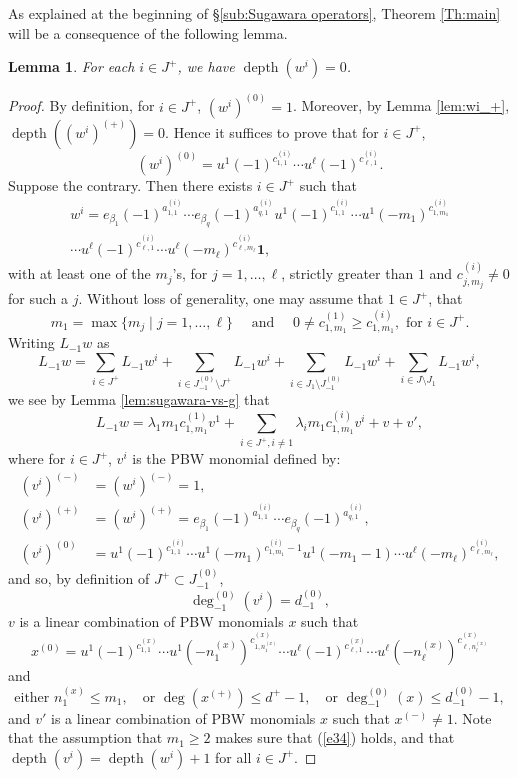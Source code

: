 \documentclass[11pt]{article}
\numberwithin{equation}{section}
\let\be\beta
\DeclareMathOperator{\dep}{depth}
\newtheorem{lem}[theorem]{Lemma}
\theoremstyle{definition}
\begin{document}
As explained at the beginning of \S\ref{sub:Sugawara operators}, Theorem
\ref{Th:main} will be a consequence of the following lemma.

\begin{lem}
\label{lem:w_0}
For each $i\in J^+$, we have $\dep(w^{i})=0$.
\end{lem}
\begin{proof}
By definition, for $i\in J^+$, $(w^i)^{(0)}=1$. Moreover, by Lemma \ref{lem:wi_+},
$\dep((w^i)^{(+)})=0$. Hence it suffices to prove that for $i\in J^+$,
\[
(w^{i})^{(0)}=u^{1}(-1)^{c^{(i)}_{1,1}}\cdots u^\ell (-1)^{c^{(i)}_{\ell,1}}.
\]
Suppose the contrary. Then
there exists $i \in J^+$ such that
\begin{multline*}
w^i = e_{\be_1}(-1)^{a^{(i)}_{1,1}}\cdots e_{\be_{q}}(-1)^{a^{(i)}_{q,1}} u^{1}(-1)^{c^{(i)}_{1,1}}
\cdots u^{1}(-m_{1})^{c^{(i)}_{1,m_1}} \\[-5pt]
\cdots u^\ell (-1)^{c^{(i)}_{\ell,1}} \cdots u^\ell(-m_{\ell})^{c^{(i)}_{\ell,m_\ell}} \mathbf{1},
\end{multline*}
with at least one of the $m_j$'s, for $j=1,\dots,\ell$, strictly greater than $1$
and $c^{(i)}_{j,m_j} \not=0$ for such a $j$.
Without loss of generality,
one may assume that $1 \in J^+$, that
\[
m_1=\max\{ m_j\mid j=1,\dots,\ell\} \quad \text{ and }
\quad 0\neq c^{(1)}_{1,m_1} \geq c^{(i)}_{1,m_1}, \text{ for } i\in J^+.
\]
Writing $L_{-1}w$ as
\[
L_{-1}w=\sum_{i \in J^+ }L_{-1}w^i
+\sum_{i\in J_{-1}^{(0)}\setminus J^+}L_{-1}w^i
+\sum_{i\in J_1\setminus J_{-1}^{(0)}}L_{-1}w^i
+\sum_{i \in J \setminus J_1}L_{-1}w^i,
\]
we see by Lemma \ref{lem:sugawara-vs-g} that
\begin{equation}\label{e17}
L_{-1}w=\lambda_1 m_1c^{(1)}_{1,m_1} v^1+\sum_{i\in J^+,i\neq 1}\lambda_im_1c^{(i)}_{1,m_1}v^i+v
+v',
\end{equation}
where for $i\in J^+$, $v^{i}$ is the PBW monomial defined by:
\begin{align}\label{e14}
(v^i)^{(-)}&=(w^i)^{(-)}=1,
\\
\label{e13}
(v^i)^{(+)}&=(w^i)^{(+)}=e_{\be_1}(-1)^{a^{(i)}_{1,1}}\cdots e_{\be_{q}}(-1)^{a^{(i)}_{q,1}},
\\
\label{e33}
(v^i)^{(0)} & = u^{1}(-1)^{c^{(i)}_{1,1}}\cdots
u^{1}(-m_{1})^{c^{(i)}_{1,m_1}-1}u^{1}(-m_{1}-1)\cdots u^\ell (-m_{\ell})^{c^{(i)}_{\ell,m_\ell}},
\end{align}
and so, by definition of $J^+ \subset J_{-1}^{(0)}$,
\begin{equation}\label{e34}
\deg_{-1}^{(0)}(v^i)=d_{-1}^{(0)},
\end{equation}
$v$ is a linear combination of PBW monomials $x$ such that
\[
x^{(0)}=u^{1}(-1)^{c^{(x)}_{1,1}}\cdots u^{1}(- n_{1}^{(x)})^{c^{(x)}_{1,n_{1}^{(x)}}}
\cdots u^\ell (-1)^{c^{(x)}_{\ell,1}}\cdots u^\ell(-n_{\ell}^{(x)})^{c^{(x)}_{\ell,n_{\ell}^{(x)}}}
\]
and
\[
\text{either } n_{1}^{(x)}\leq m_1,\quad
\text{or }
\deg(x^{(+)})\leq d^+ -1,\quad
\text{or }
\deg_{-1}^{(0)}(x)\leq d_{-1}^{(0)}-1,
\]
and $v'$ is a linear combination of PBW monomials $x$ such that $x^{(-)}\neq 1$.
Note that the assumption that $m_1\geq 2$ makes sure that (\ref{e34}) holds,
and that $\dep(v^{i}) =\dep(w^i)+1$ for all $i \in J^+$.


\end{proof}
\end{document}
